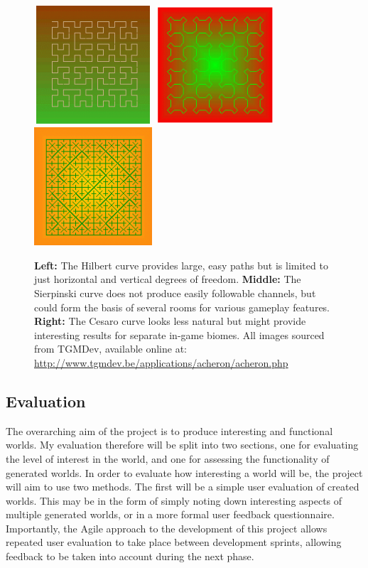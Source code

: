\documentclass[12pt,a4paper]{article}
\begin{document}
\begin{figure}
\centering
	\includegraphics[width=4.4cm,height=4.4cm]{images/hilbert.png}
	\includegraphics[width=4.4cm,height=4.4cm]{images/sierpinskicrv.png}
	\includegraphics[width=4.4cm,height=4.4cm]{images/cesaro.png}
	\caption[]{\label{fig:fig9} \textbf{Left:} The Hilbert curve provides large, easy paths but is limited to just horizontal and vertical degrees of freedom. \textbf{Middle:} The Sierpinski curve does not produce easily followable channels, but could form the basis of several rooms for various gameplay features. \textbf{Right:} The Cesaro curve looks less natural but might provide interesting results for separate in-game biomes. All images sourced from TGMDev, available online at: \url{http://www.tgmdev.be/applications/acheron/acheron.php}	}
	
\end{figure}


\subsection{Evaluation}

The overarching aim of the project is to produce interesting and functional worlds. My evaluation therefore will be split into two sections, one for evaluating the level of interest in the world, and one for assessing the functionality of generated worlds. In order to evaluate how interesting a world will be, the project will aim to use two methods. The first will be a simple user evaluation of created worlds. This may be in the form of simply noting down interesting aspects of multiple generated worlds, or in a more formal user feedback questionnaire. Importantly, the Agile approach to the development of this project allows repeated user evaluation to take place between development sprints, allowing feedback to be taken into account during the next phase. \\
\end{document}
